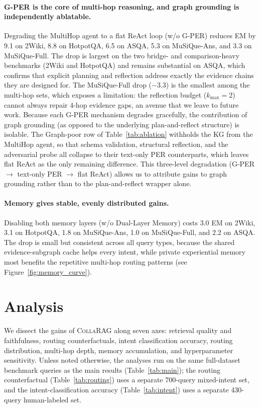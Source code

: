 \documentclass[11pt,a4paper]{article}
\newcommand{\sys}{\textsc{CollaRAG}}
\begin{document}
\paragraph{G-PER is the core of multi-hop reasoning, and graph grounding is independently ablatable.}
Degrading the MultiHop agent to a flat ReAct loop (w/o G-PER) reduces EM by 9.1 on 2Wiki, 8.8 on HotpotQA, 6.5 on ASQA, 5.3 on MuSiQue-Ans, and 3.3 on MuSiQue-Full.
The drop is largest on the two bridge- and comparison-heavy benchmarks (2Wiki and HotpotQA) and remains substantial on ASQA, which confirms that explicit planning and reflection address exactly the evidence chains they are designed for.
The MuSiQue-Full drop ($-$3.3) is the smallest among the multi-hop sets, which exposes a limitation: the reflection budget ($k_{\max}{=}2$) cannot always repair 4-hop evidence gaps, an avenue that we leave to future work.
Because each G-PER mechanism degrades gracefully, the contribution of graph grounding (as opposed to the underlying plan-and-reflect structure) is isolable.
The Graph-poor row of Table~\ref{tab:ablation} withholds the KG from the MultiHop agent, so that schema validation, structural reflection, and the adversarial probe all collapse to their text-only PER counterparts, which leaves flat ReAct as the only remaining difference.
This three-level degradation (G-PER $\to$ text-only PER $\to$ flat ReAct) allows us to attribute gains to graph grounding rather than to the plan-and-reflect wrapper alone.

\paragraph{Memory gives stable, evenly distributed gains.}
Disabling both memory layers (w/o Dual-Layer Memory) costs 3.0 EM on 2Wiki, 3.1 on HotpotQA, 1.8 on MuSiQue-Ans, 1.0 on MuSiQue-Full, and 2.2 on ASQA.
The drop is small but consistent across all query types, because the shared evidence-subgraph cache helps every intent, while private experiential memory most benefits the repetitive multi-hop routing patterns (see Figure~\ref{fig:memory_curve}).

\section{Analysis}
\label{sec:analysis}

We dissect the gains of \sys{} along seven axes: retrieval quality and faithfulness, routing counterfactuals, intent classification accuracy, routing distribution, multi-hop depth, memory accumulation, and hyperparameter sensitivity.
Unless noted otherwise, the analyses run on the same full-dataset benchmark queries as the main results (Table~\ref{tab:main}); the routing counterfactual (Table~\ref{tab:routing}) uses a separate 700-query mixed-intent set, and the intent-classification accuracy (Table~\ref{tab:intent}) uses a separate 430-query human-labeled set.
\end{document}

